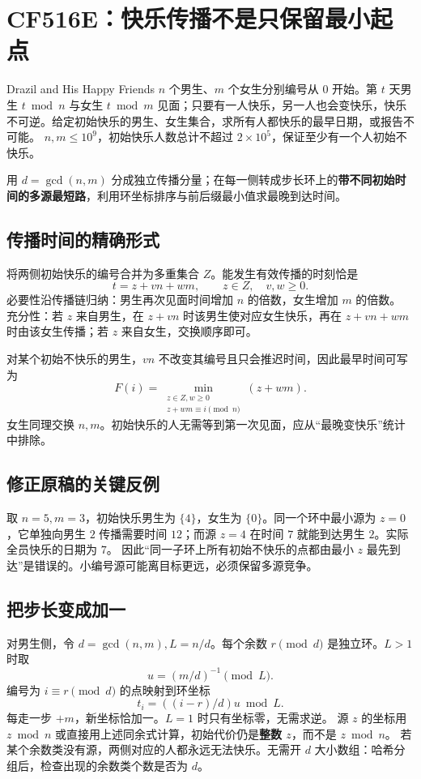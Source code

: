 \section{CF516E：快乐传播不是只保留最小起点}
\begin{problem}{Drazil and His Happy Friends}
$n$ 个男生、$m$ 个女生分别编号从 $0$ 开始。第 $t$ 天男生 $t\bmod n$ 与女生 $t\bmod m$ 见面；只要有一人快乐，另一人也会变快乐，快乐不可逆。给定初始快乐的男生、女生集合，求所有人都快乐的最早日期，或报告不可能。
$n,m\le10^9$，初始快乐人数总计不超过 $2\times10^5$，保证至少有一个人初始不快乐。
\end{problem}
\hint 用 $d=\gcd(n,m)$ 分成独立传播分量；在每一侧转成步长环上的\textbf{带不同初始时间的多源最短路}，利用环坐标排序与前后缀最小值求最晚到达时间。

\subsection{传播时间的精确形式}
将两侧初始快乐的编号合并为多重集合 $Z$。能发生有效传播的时刻恰是
\[
 t=z+vn+wm,\qquad z\in Z,\quad v,w\ge0.
\]
必要性沿传播链归纳：男生再次见面时间增加 $n$ 的倍数，女生增加 $m$ 的倍数。
充分性：若 $z$ 来自男生，在 $z+vn$ 时该男生使对应女生快乐，再在 $z+vn+wm$ 时由该女生传播；若 $z$ 来自女生，交换顺序即可。

对某个初始不快乐的男生，$vn$ 不改变其编号且只会推迟时间，因此最早时间可写为
\[
 F(i)=\min_{\substack{z\in Z,w\ge0\\z+wm\equiv i\pmod n}}(z+wm).
\]
女生同理交换 $n,m$。初始快乐的人无需等到第一次见面，应从“最晚变快乐”统计中排除。

\subsection{修正原稿的关键反例}
取 $n=5,m=3$，初始快乐男生为 $\{4\}$，女生为 $\{0\}$。同一个环中最小源为 $z=0$，它单独向男生 $2$ 传播需要时间 $12$；而源 $z=4$ 在时间 $7$ 就能到达男生 $2$。实际全员快乐的日期为 $7$。
因此“同一子环上所有初始不快乐的点都由最小 $z$ 最先到达”是错误的。小编号源可能离目标更远，必须保留多源竞争。

\subsection{把步长变成加一}
对男生侧，令 $d=\gcd(n,m),L=n/d$。每个余数 $r\pmod d$ 是独立环。$L>1$ 时取
\[
 u=(m/d)^{-1}\pmod L.
\]
编号为 $i\equiv r\pmod d$ 的点映射到环坐标
\[
 t_i=((i-r)/d)u\bmod L.
\]
每走一步 $+m$，新坐标恰加一。$L=1$ 时只有坐标零，无需求逆。
源 $z$ 的坐标用 $z\bmod n$ 或直接用上述同余式计算，初始代价仍是\textbf{整数 $z$}，而不是 $z\bmod n$。
若某个余数类没有源，两侧对应的人都永远无法快乐。无需开 $d$ 大小数组：哈希分组后，检查出现的余数类个数是否为 $d$。

